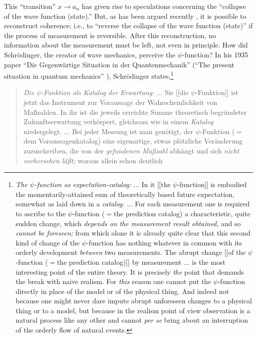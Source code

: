 \begin{description}
This ``transition'' $x\rightarrow a_n$ has given rise to speculations
concerning the
``collapse
of the wave function (state).''  But, as has been argued recently
 \cite{greenberger2},
 it is
possible to reconstruct coherence; i.e., to ``reverse the collapse of
the wave function (state)'' if the process of measurement is
reversible. After this reconstruction, no information about the
measurement must be left, not even in principle.
How did Schr\"odinger, the creator of wave mechanics, perceive the
$\psi$-function? In his
1935 paper
``Die Gegenw\"artige
Situation in der Quantenmechanik'' (``The present situation in quantum
mechanics''
\cite[p. 53]{schrodinger}), Schr\"odinger states,\footnote{
{\em The $\psi$-function as expectation-catalog:}
$\ldots$
In it [[the $\psi$-function]] is embodied the momentarily-attained sum
of theoretically based future expectation, somewhat as laid down in a
{\em catalog.}
$\ldots$
For each measurement one is required to ascribe to the $\psi$-function
($=$the prediction catalog) a characteristic, quite sudden change,
which {\em depends on the measurement result obtained,} and so {\em
cannot be foreseen;} from which alone it is already quite clear
that this second kind of change of the $\psi$-function has nothing
whatever in common with its orderly development {\em between} two
measurements. The abrupt change [[of the $\psi$-function ($=$the
prediction catalog)]] by measurement $\ldots$ is the most interesting
point of the entire theory. It is precisely {\em the} point that demands
the break with naive realism. For {\em this} reason one cannot put the
$\psi$-function directly in place of the model or of the physical thing.
And indeed not because one might never dare impute abrupt unforeseen
changes to a physical thing or to a model, but because in the realism
point of view observation is a natural process like any other and cannot
{\em per se} bring about an interruption of the orderly flow of natural
events.
}
\begin{quote}
{\em Die $\psi$-Funktion als Katalog der Erwartung:}
$\ldots$
Sie [[die $\psi$-Funktion]] ist jetzt das Instrument zur Voraussage der
Wahrscheinlichkeit von Ma\ss zahlen. In ihr ist die jeweils erreichte
Summe theoretisch begr\"undeter Zukunftserwartung verk\"orpert,
gleichsam wie in einem {\em Katalog} niedergelegt.
$\ldots$
Bei jeder Messung ist man gen\"otigt, der $\psi$-Funktion ($=$dem
Voraussagenkatalog) eine eigenartige, etwas pl\"otzliche Ver\"anderung
zuzuschreiben, die von der {\em gefundenen Ma\ss zahl} abh\"angt und
sich {\em nicht vorhersehen l\"a\ss t;} woraus allein schon deutlich

\end{quote}
\end{description}
